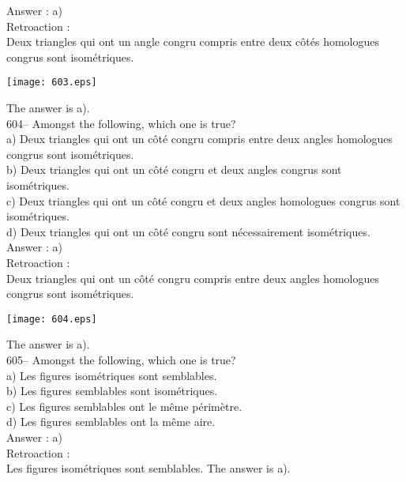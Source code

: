﻿\documentclass[letterpaper, 12pt]{article}
\begin{document}
Answer : a)\\

Retroaction : \\
Deux triangles qui ont un angle congru compris entre deux c\^ot\'es
homologues congrus sont isom\'etriques.   \begin{center}
    \texttt{[image: 603.eps]}
    \end{center}  The answer is a).\\

604-- Amongst the following, which one is true?\\
a) Deux triangles qui ont un c\^ot\'e congru compris entre deux angles
homologues congrus sont isom\'etriques.\\
b) Deux triangles qui ont un c\^ot\'e congru et deux angles congrus sont
isom\'etriques.\\
c) Deux triangles qui ont un c\^ot\'e congru et deux angles homologues
congrus sont isom\'etriques.\\
d) Deux triangles qui ont un c\^ot\'e congru sont n\'ecessairement
isom\'etriques.\\

Answer : a) \\

Retroaction : \\
Deux triangles qui ont un c\^ot\'e congru compris entre deux angles
homologues congrus sont isom\'etriques.   \begin{center}
    \texttt{[image: 604.eps]}
    \end{center}  The answer is a).\\

605-- Amongst the following, which one is true?\\
a) Les figures isom\'etriques sont semblables.\\
b) Les figures semblables sont isom\'etriques.\\
c) Les figures semblables ont le m\^eme p\'erim\`etre.\\
d) Les figures semblables ont la m\^eme aire.\\

Answer : a)\\

Retroaction : \\
Les figures isom\'etriques sont semblables.  The answer is a).\\
\end{document}
